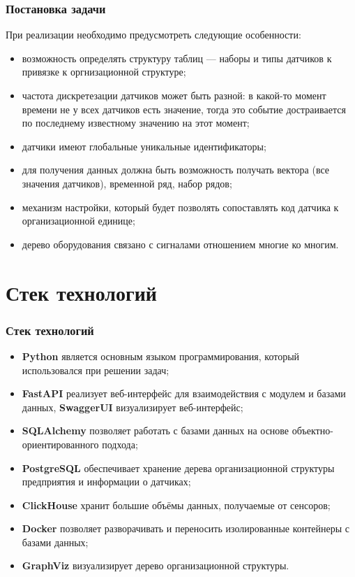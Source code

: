 \documentclass[pdf, hyperref={unicode}, aspectratio=169]{beamer}
\begin{document}
\begin{frame}
	\frametitle{Постановка задачи}
	
	При реализации необходимо предусмотреть следующие особенности:
	\begin{itemize}
		\item возможность определять структуру таблиц --- наборы и типы датчиков к привязке к оргнизационной структуре;
		\item частота дискретезации датчиков может быть разной: в какой-то момент времени не у всех датчиков есть значение, тогда это событие достраивается по последнему известному значению на этот момент;
		\item датчики имеют глобальные уникальные идентификаторы;
		\item для получения данных должна быть возможность получать вектора (все значения датчиков), временной ряд, набор рядов;
		\item механизм настройки, который будет позволять сопоставлять код датчика к организационной единице;
		\item дерево оборудования связано с сигналами отношением многие ко многим.
	\end{itemize}
\end{frame}





\section{Стек технологий}
\begin{frame}
	\frametitle{Стек технологий}
	
	\begin{itemize}
		\item \textbf{Python} является основным языком программирования, который использовался при решении задач;
		\item \textbf{FastAPI} реализует веб-интерфейс для взаимодействия с модулем и базами данных, \textbf{SwaggerUI} визуализирует веб-интерфейс;
		\item \textbf{SQLAlchemy} позволяет работать с базами данных на основе объектно-ориентированного подхода;
		\item \textbf{PostgreSQL} обеспечивает хранение дерева организационной структуры предприятия и информации о датчиках;
		\item \textbf{ClickHouse} хранит большие объёмы данных, получаемые от сенсоров;
		\item \textbf{Docker} позволяет разворачивать и переносить изолированные контейнеры с базами данных;
		\item \textbf{GraphViz} визуализирует дерево организационной структуры.
	\end{itemize}
\end{frame}
\end{document}
